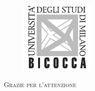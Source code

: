 \begin{tframe}
    \begin{figure}
        \centering
        \includegraphics[width=0.18\columnwidth]{assets/images/unimib/logo.pdf}
    \end{figure}

    \vspace{5mm}
    \centering\Huge\textsc{Grazie per l'attenzione}
\end{tframe}